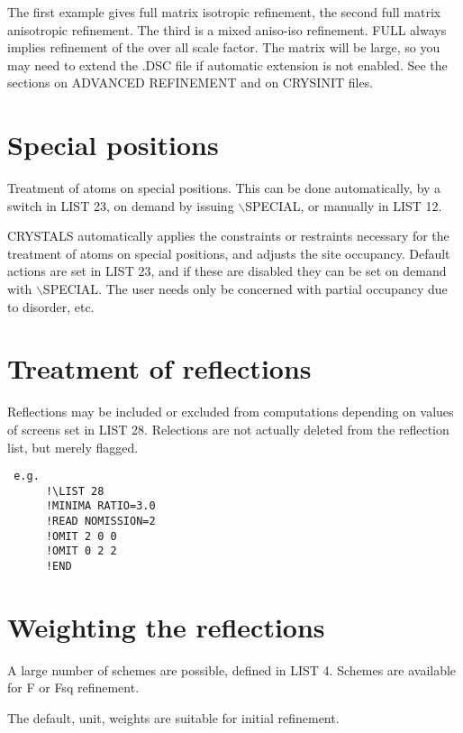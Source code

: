 \documentclass[10pt,a4paper]{report}
\begin{document}
The first example gives full matrix isotropic refinement, the second
 full matrix anisotropic refinement. The third is a mixed aniso-iso
 refinement.
 FULL always implies refinement of the over all scale factor.
 The matrix will be large, so you may need to
 extend the .DSC file if automatic extension is not enabled. See the
 sections on ADVANCED REFINEMENT and on CRYSINIT files.




\section{Special positions}


Treatment of atoms on special positions. This can be done automatically, by
 a switch in LIST 23, on demand by issuing $\backslash$SPECIAL, or manually in LIST 12.



CRYSTALS automatically applies the constraints or restraints necessary for
 the treatment of atoms on special positions, and adjusts the site
 occupancy. Default actions are set in LIST 23, and if these are disabled
 they can be set on demand with $\backslash$SPECIAL. The user needs only be concerned
 with partial occupancy due to disorder, etc.




\section{Treatment of reflections}
 Reflections may be included or excluded from computations
 depending on values of screens set in LIST 28. Relections are not actually
 deleted from the reflection list, but merely flagged.

\small\begin{verbatim}
 e.g.
      !\LIST 28
      !MINIMA RATIO=3.0
      !READ NOMISSION=2
      !OMIT 2 0 0
      !OMIT 0 2 2
      !END
\end{verbatim}\normalsize






\section{Weighting the reflections }
 A large number of schemes are possible,  defined in LIST 4. Schemes are
available for F or Fsq refinement.



The default, unit, weights are suitable for initial refinement.
\end{document}
